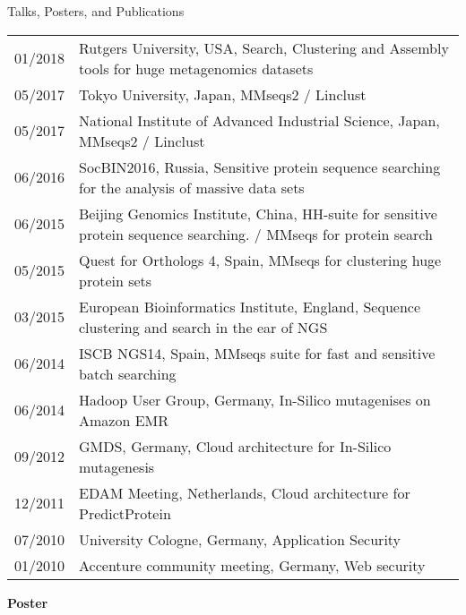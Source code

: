 \documentclass{resume} %
\begin{document}
\begin{rSection}{Talks, Posters, and Publications}
\begin{tabular}{p{2.5cm}p{14.1cm}}
01/2018 & Rutgers University, USA, Search, Clustering and Assembly tools for huge metagenomics datasets
\\[1.mm] 
05/2017 & Tokyo University, Japan, MMseqs2 / Linclust
\\[1.mm] 
05/2017 & National Institute of Advanced Industrial Science, Japan, MMseqs2 / Linclust
\\[1.mm] 
06/2016 & SocBIN2016,  Russia, Sensitive protein sequence searching for the analysis of massive data sets
\\[1.mm] 
06/2015 & Beijing Genomics Institute, China, HH-suite for sensitive protein sequence searching. / MMseqs for protein search
\\[1.mm] 
05/2015 & Quest for Orthologs 4, Spain, MMseqs for clustering huge protein sets
\\[1.mm] 
03/2015 & European Bioinformatics Institute, England, Sequence clustering and search in the ear of NGS
\\[1.mm] 
06/2014 & ISCB NGS14, Spain, MMseqs suite for fast and sensitive batch searching
\\[1.mm] 
06/2014 & Hadoop User Group, Germany, In-Silico mutagenises on Amazon EMR
\\[1.mm] 
09/2012 & GMDS, Germany, Cloud architecture for In-Silico mutagenesis
\\[1.mm] 
12/2011 & EDAM Meeting, Netherlands, Cloud architecture for PredictProtein
\\[1.mm] 
07/2010 & University Cologne, Germany, Application Security
\\[1.mm] 
01/2010 & Accenture community meeting, Germany, Web security
\\[1mm]
\end{tabular}

\vspace{1mm}

{\bf Poster }\vspace{1mm}


\end{rSection}
\end{document}
